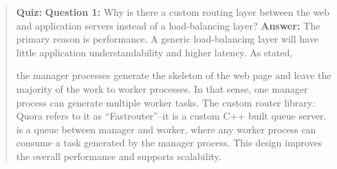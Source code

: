 \begin{quote}
\textbf{Quiz:}
\textbf{Question 1:} Why is there a custom routing layer between the web and application servers instead of a load-balancing layer?
\textbf{Answer:} The primary reason is performance. A generic load-balancing layer will have little application understandability and higher latency. As stated,

the manager processes generate the skeleton of the web page and leave the majority of the work to worker processes. In that sense, one manager process can generate multiple worker tasks. The custom  router library: Quora refers to it as ``Fastrouter''--it is a custom C++ built queue server.  is a queue between manager and worker, where any worker process can consume a task generated by the manager process. This design improves the overall performance and supports scalability.
\end{quote}



